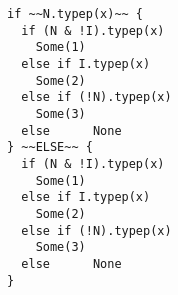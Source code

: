 \begin{lstlisting}[style=scalaioScala]
if ~~N.typep(x)~~ {
  if (N & !I).typep(x)
    Some(1)
  else if I.typep(x)
    Some(2)
  else if (!N).typep(x)
    Some(3)
  else      None
} ~~ELSE~~ {
  if (N & !I).typep(x)
    Some(1)
  else if I.typep(x)
    Some(2)
  else if (!N).typep(x)
    Some(3)
  else      None
}
\end{lstlisting}
